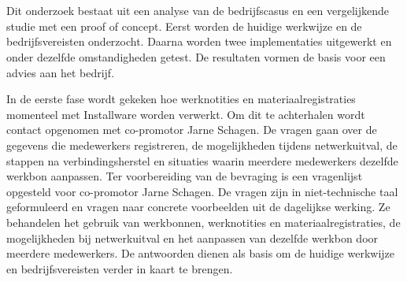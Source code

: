 
\chapter{}%
\label{ch:methodologie}


Dit onderzoek bestaat uit een analyse van de bedrijfscasus en een vergelijkende studie met een proof of concept.
Eerst worden de huidige werkwijze en de bedrijfsvereisten onderzocht. Daarna worden twee implementaties
uitgewerkt en onder dezelfde omstandigheden getest. De resultaten vormen de basis voor een advies aan het bedrijf.

In de eerste fase wordt gekeken hoe werknotities en materiaalregistraties momenteel met Installware worden verwerkt.
Om dit te achterhalen wordt contact opgenomen met co-promotor Jarne Schagen. De vragen gaan over de gegevens die medewerkers
registreren, de mogelijkheden tijdens netwerkuitval, de stappen
na verbindingsherstel en situaties waarin meerdere medewerkers dezelfde werkbon aanpassen. 
Ter voorbereiding van de bevraging is een vragenlijst opgesteld voor co-promotor Jarne Schagen. De vragen zijn in niet-technische taal
geformuleerd en vragen naar concrete voorbeelden uit de dagelijkse werking. Ze behandelen het gebruik van werkbonnen, werknotities en
materiaalregistraties, de mogelijkheden bij netwerkuitval en het aanpassen van dezelfde werkbon door meerdere medewerkers.
De antwoorden dienen als basis om de huidige werkwijze en bedrijfsvereisten verder in kaart te brengen.

